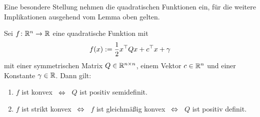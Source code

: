 \documentclass[ %
ngerman, %
a4paper, 
11pt,%
sectionreset, %
chapterstyle=framed, %
sectionstyle=pure, %
titlefont=osfamily %
]{../texmf/tex/latex/mathscriptMathTUD/mathscriptMathTUD}
\begin{document}

Eine besondere Stellung nehmen die quadratischen Funktionen ein, für die weitere Implikationen ausgehend vom Lemma oben gelten.

\begin{lemma} \label{lemma: quadratischeFunktion}
	Sei $\abb{f}{\Rn}{\R}$ eine quadratische Funktion mit
	\begin{align*}
		f(x) \mathrel{:=} \frac{1}{2} x^{\top} Q x + c^{\top} x + \gamma
	\end{align*}
	mit einer symmetrischen Matrix $Q \in \mathbb{R}^{n \times n}$, einem Vektor $c \in \mathbb{R}^n$ und einer Konstante $\gamma \in \mathbb{R}$. Dann gilt:
	\begin{enumerate}[leftmargin=*, label=(\roman*), nolistsep]
		\item $f$ ist konvex $\enskip \Leftrightarrow \enskip$ $Q$ ist positiv semidefinit.
		\item $f$ ist strikt konvex $\enskip \Leftrightarrow \enskip$ $f$ ist gleichmäßig konvex $\enskip \Leftrightarrow \enskip$ $Q$ ist positiv definit.
	\end{enumerate}
\end{lemma}
\end{document}
